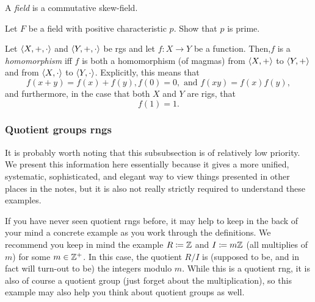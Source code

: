 \begin{dfn}[Field]
A \emph{field} is a commutative skew-field.
\end{dfn}
\begin{exr}
Let $F$ be a field with positive characteristic $p$.  Show that $p$ is prime.
\end{exr}
\begin{dfn}
Let $\langle X,+,\cdot\rangle$ and $\langle Y,+,\cdot\rangle$ be rgs and let $f:X\rightarrow Y$ be a function.  Then,$f$ is a \emph{homomorphism} iff $f$ is both a homomorphism (of magmas) from $\langle X,+\rangle$ to $\langle Y,+\rangle$ and from $\langle X,\cdot\rangle$ to $\langle Y,\cdot\rangle$.  Explicitly, this means that
\begin{equation}
f(x+y)=f(x)+f(y),f(0)=0,\text{ and }f(xy)=f(x)f(y),
\end{equation}
and furthermore, in the case that both $X$ and $Y$ are rigs, that
\begin{equation}
f(1)=1.
\end{equation}
\end{dfn}

\subsubsection{Quotient groups rngs}

It is probably worth noting that this subsubsection is of relatively low priority.  We present this information here essentially because it gives a more unified, systematic, sophisticated, and elegant way to view things presented in other places in the notes, but it is also not really strictly required to understand these examples.

If you have never seen quotient rngs before, it may help to keep in the back of your mind a concrete example as you work through the definitions.  We recommend you keep in mind the example $R\coloneqq \mathbb{Z}$ and $I\coloneqq m\mathbb{Z}$ (all multiplies of $m$) for some $m\in \mathbb{Z} ^+$.  In this case, the quotient $R/I$ is (supposed to be, and in fact will turn-out to be) the integers modulo $m$.  While this is a quotient rng, it is also of course a quotient group (just forget about the multiplication), so this example may also help you think about quotient groups as well.

